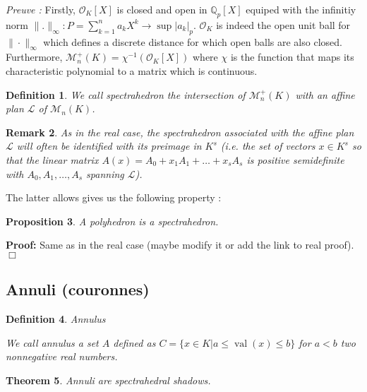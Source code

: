 \documentclass[a4paper,12pt]{article}
\newenvironment{proof}{\hbox{}\vspace{-0.5cm} {\bf Proof:}}{\hfill $\Box$ \\}
\newtheorem{theorem}{Theorem}[section]
\newtheorem{proposition}[theorem]{Proposition}
\newtheorem{definition}[theorem]{Definition}
\newtheorem{remark}[theorem]{Remark}
\DeclareMathOperator{\val}{val}
\newcommand{\OK}{\mathcal{O}_K}
\begin{document}
\textit{Preuve :}  
Firstly, $\OK[X]$ is closed and open in $\mathbb{Q}_{ p }[X] $ equiped with the infinitiy norm $\|.\|_\infty : P = \sum_{k=1}^{n} a_k X^k \to \sup |a_k|_p$. $\OK$ is indeed the open unit ball for $\|\cdot \|_\infty$ which defines a discrete distance for which open balls are also closed.
Furthermore, $\mathcal{M}^+_{n}\left(K \right)  = \chi^{-1}( \OK[X]) $ where $\chi$ is the function that maps its characteristic polynomial to a matrix which is continuous.

%


\begin{definition}
	We call {\it spectrahedron} the intersection of $\mathcal{M}_n^+\left( K \right) $ with an affine plan $\mathcal{L}$ of $\mathcal{M}_n\left( K \right) $.
\end{definition}

\begin{remark}
	As in the real case, the spectrahedron associated with the affine plan $\mathcal{L}$ will often be identified with its preimage in $K^s$ (i.e. the set of vectors $x \in K ^s$ so that the linear matrix $A(x) = A_0 + x_1A_1 + \ldots + x_sA_s$ is positive semidefinite with $A_0,A_1,\ldots,A_s$ spanning $\mathcal{L}$). 
\end{remark}

The latter allows gives us the following property :
\begin{proposition}
	A polyhedron is a spectrahedron.
\end{proposition}
\begin{proof}
	Same as in the real case (maybe modify it or add the link to real proof).
\end{proof}


\subsection{Annuli (couronnes)}
\begin{definition}
	Annulus
	
	We call {\it annulus} a set $A$ defined as $C = \{x \in K  | a\le \val\left(x\right) \le b\} $ for $a < b$ two nonnegative real numbers.
\end{definition}


\begin{theorem}
	Annuli are spectrahedral shadows.
\end{theorem} 
\end{document}
